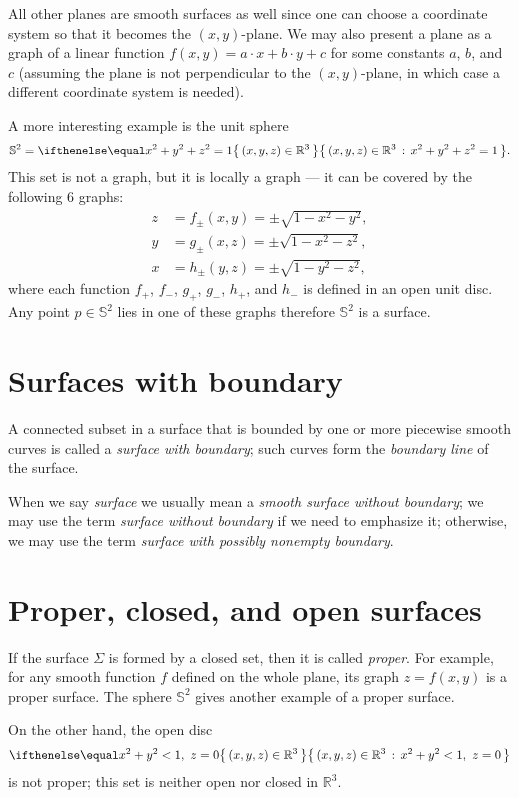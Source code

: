 All other planes are smooth surfaces as well since one can choose a coordinate system so that it becomes the $(x,y)$-plane.
We may also present a plane as a graph of a linear function 
$f(x,y)=a\cdot x+b\cdot y+c$ for some constants $a$, $b$, and $c$
(assuming the plane is not perpendicular to the $(x,y)$-plane, in which case a different coordinate system is needed).

A more interesting example is the unit sphere 
\[\mathbb{S}^2=\set{(x,y,z)\in\mathbb{R}^3}{x^2+y^2+z^2=1}.\]
This set is not a graph,
but it is locally a graph ---
it can be covered by the following 6 graphs:
\begin{align*}
z&=f_\pm(x,y)=\pm \sqrt{1-x^2-y^2},
\\
y&=g_\pm(x,z)=\pm \sqrt{1-x^2-z^2},
\\
x&=h_\pm(y,z)=\pm \sqrt{1-y^2-z^2},
\end{align*}
where each function $f_+$, $f_-$, $g_+$, $g_-$, $h_+$, and $h_-$ is defined in an open unit disc.
Any point $p\in\mathbb{S}^2$ lies in one of these graphs therefore $\mathbb{S}^2$ is a surface.

\section{Surfaces with boundary}
A connected subset in a surface that is bounded by one or more piecewise
smooth curves is called a \emph{surface with boundary}; such curves form the \emph{boundary line} of the surface.

When we say {}\emph{surface} we usually mean a {}\emph{smooth surface without boundary};
we may use the term {}\emph{surface without boundary} if we need to emphasize it;
otherwise, we may use the term {}\emph{surface with possibly nonempty boundary}.

\section{Proper, closed, and open surfaces}
If the surface $\Sigma$ is formed by a closed set, then it is called \emph{proper}.
For example, for any smooth function $f$ defined on the whole plane, its graph $z=f(x,y)$ is a proper surface.
The sphere $\mathbb{S}^2$ gives another example of a proper surface.

On the other hand, the open disc 
\[\set{(x,y,z)\in\mathbb{R}^3}{x^2+y^2<1,\  z=0}\]
is not proper; this set is neither open nor closed in $\mathbb{R}^3$.

